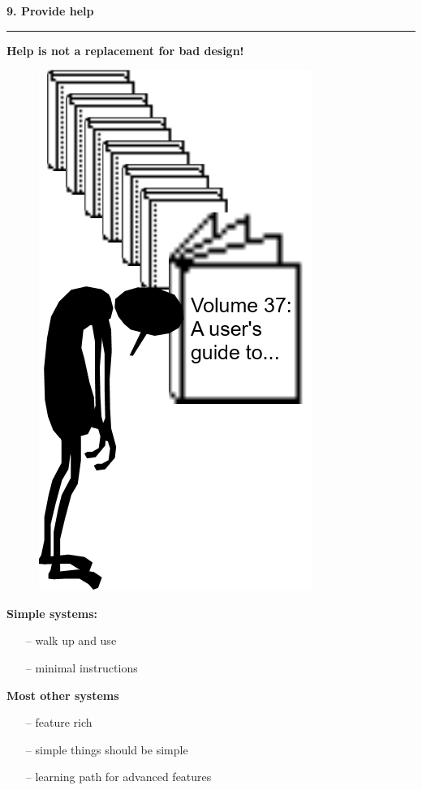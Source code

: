 \documentclass[pdf]{beamer}
\begin{document}
\begin{frame}
{\textbf{9. Provide help}}{\textcolor{red}{\rule{12cm}{1.2pt}}}
    
 	\bigskip
    
    \textbf{Help is not a replacement for bad design!}
    \bigskip
   	\begin{figure}
      \centering
      \includegraphics[scale = 0.45, right]{50_picture.png}   
	\end{figure}
    \textbf{Simple systems:}
    \begin{itemize}
      \item[--] {walk up and use}
      \item[--] {minimal instructions}
    \end{itemize}
   	\textbf{Most other systems}
    \begin{itemize}
      \item[--] {feature rich}
	  \item[--] {simple things should be simple}
	  \item[--] {learning path for advanced features}
    \end{itemize}
 	\vspace{40px}
\end{frame}
\end{document}
